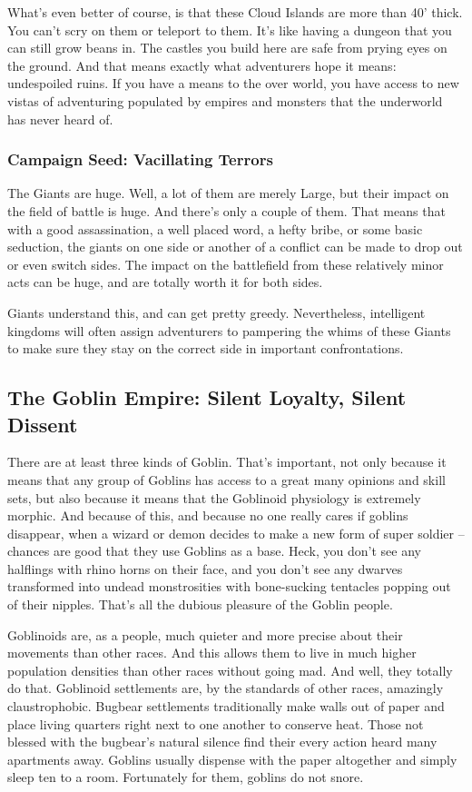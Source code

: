 What's even better of course, is that these Cloud Islands are more than 40' thick. You can't scry on them or teleport to them. It's like having a dungeon that you can still grow beans in. The castles you build here are safe from prying eyes on the ground. And that means exactly what adventurers hope it means: undespoiled ruins. If you have a means to the over world, you have access to new vistas of adventuring populated by empires and monsters that the underworld has never heard of.

\subsubsection{Campaign Seed: Vacillating Terrors}
The Giants are huge. Well, a lot of them are merely Large, but their impact on the field of battle is huge. And there's only a couple of them. That means that with a good assassination, a well placed word, a hefty bribe, or some basic seduction, the giants on one side or another of a conflict can be made to drop out or even switch sides. The impact on the battlefield from these relatively minor acts can be huge, and are totally worth it for both sides.

Giants understand this, and can get pretty greedy. Nevertheless, intelligent kingdoms will often assign adventurers to pampering the whims of these Giants to make sure they stay on the correct side in important confrontations.

\subsection{The Goblin Empire: Silent Loyalty, Silent Dissent}

There are at least three kinds of Goblin. That's important, not only because it means that any group of Goblins has access to a great many opinions and skill sets, but also because it means that the Goblinoid physiology is extremely morphic. And because of this, and because no one really cares if goblins disappear, when a wizard or demon decides to make a new form of super soldier -- chances are good that they use Goblins as a base. Heck, you don't see any halflings with rhino horns on their face, and you don't see any dwarves transformed into undead monstrosities with bone-sucking tentacles popping out of their nipples. That's all the dubious pleasure of the Goblin people.

Goblinoids are, as a people, much quieter and more precise about their movements than other races. And this allows them to live in much higher population densities than other races without going mad. And well, they totally do that. Goblinoid settlements are, by the standards of other races, amazingly claustrophobic. Bugbear settlements traditionally make walls out of paper and place living quarters right next to one another to conserve heat. Those not blessed with the bugbear's natural silence find their every action heard many apartments away. Goblins usually dispense with the paper altogether and simply sleep ten to a room. Fortunately for them, goblins do not snore.

